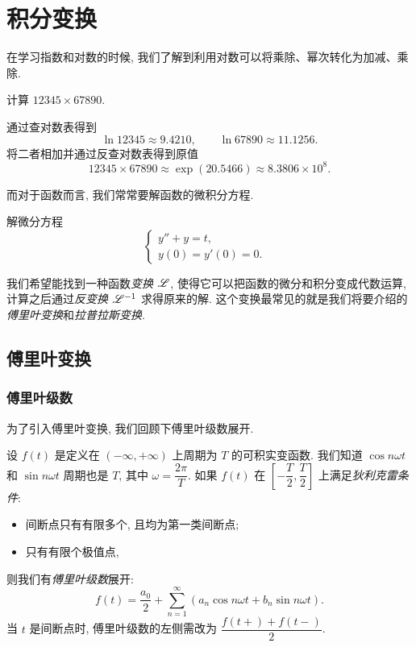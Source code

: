 

\chapter{积分变换}

在学习指数和对数的时候, 我们了解到利用对数可以将乘除、幂次转化为加减、乘除.
\begin{example}
	计算 $12345\times 67890$.
\end{example}
\begin{solution}
	通过查对数表得到
		\[\ln 12345\approx 9.4210,\qquad\ln 67890\approx 11.1256.\]%
	将二者相加并通过反查对数表得到原值
		\[12345\times 67890\approx \exp(20.5466)\approx 8.3806\times 10^8.\]
\end{solution}

而对于函数而言, 我们常常要解函数的微积分方程.
\begin{example}
	解微分方程
	\[\begin{cases}
		y''+y=t,&\\
		y(0)=y'(0)=0.&
	\end{cases}\]
\end{example}
\begin{solution}
		我们希望能找到一种函数\emph{变换 $\mathscr{L}$}, 使得它可以把函数的微分和积分变成代数运算, 计算之后通过\emph{反变换 $\mathscr{L}^{-1}$} 求得原来的解.
		这个变换最常见的就是我们将要介绍的\emph{傅里叶变换}和\emph{拉普拉斯变换}.
\end{solution}

\section{傅里叶变换}

\subsection{傅里叶级数}

为了引入傅里叶变换, 我们回顾下傅里叶级数展开.

设 $f(t)$ 是定义在 $(-\infty,+\infty)$ 上周期为 $T$ 的可积实变函数.
我们知道 $\cos n\omega t$ 和 $\sin n\omega t$ 周期也是 $T$, 其中 $\omega=\dfrac{2\pi}T$.
如果 $f(t)$ 在 $\left[-\dfrac T2,\dfrac T2\right]$ 上满足\emph{狄利克雷条件}:
\begin{itemize}
	\item 间断点只有有限多个, 且均为第一类间断点;
	\item 只有有限个极值点,
\end{itemize}
则我们有\emph{傅里叶级数}展开:
	\[f(t)=\frac{a_0}2+\sum_{n=1}^\infty \left(a_n\cos n\omega t+b_n \sin n\omega t\right).\]
当 $t$ 是间断点时, 傅里叶级数的左侧需改为 $\dfrac{f(t+)+f(t-)}2$.


